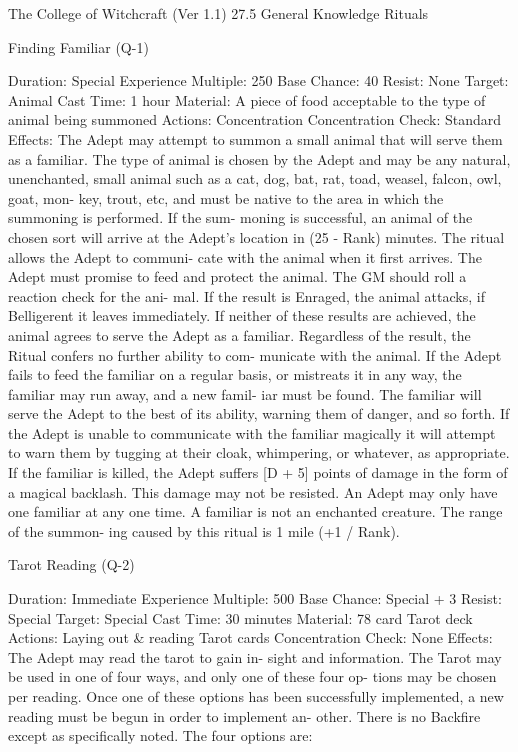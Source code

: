 \begin{Chapter}{The College of Witchcraft (Ver 1.1)}
27.5 General Knowledge Rituals 

Finding Familiar (Q-1) 

Duration: Special 
Experience Multiple: 250 
Base Chance: 40%
Resist: None 
Target: Animal 
Cast Time: 1 hour 
Material: A piece of food acceptable to the type of 
animal being summoned 
Actions: Concentration 
Concentration Check: Standard 
Effects: The Adept may attempt to summon a small 
animal that will serve them as a familiar. The type 
of  animal  is  chosen  by  the  Adept  and  may  be  any 
natural,  unenchanted,  small  animal  such  as  a  cat, 
dog, bat, rat, toad, weasel, falcon, owl, goat, mon-
key,  trout,  etc,  and  must  be  native  to  the  area  in 
which  the  summoning  is  performed.  If  the  sum-
moning is successful, an animal of the chosen sort 
will  arrive  at  the  Adept’s  location  in  (25  -  Rank) 
minutes.  The  ritual  allows  the  Adept  to  communi-
cate  with  the  animal  when  it  first  arrives.  The 
Adept must promise to feed and protect the animal. 
The  GM  should  roll  a  reaction  check  for  the  ani-
mal.  If the result is Enraged, the animal attacks, if 
Belligerent  it  leaves  immediately.  If  neither  of 
these  results  are  achieved,  the  animal  agrees  to 
serve  the  Adept  as  a  familiar.  Regardless  of  the 
result, the Ritual confers no further ability to com-
municate with the animal. If the Adept fails to feed 
the familiar on a regular basis, or mistreats it in any 
way, the familiar may run away, and a new famil-
iar  must  be  found.  The  familiar  will  serve  the 
Adept  to  the  best  of  its  ability,  warning  them  of 
danger,  and  so  forth.  If  the  Adept  is  unable  to 
communicate  with  the  familiar  magically  it  will 
attempt  to  warn  them  by  tugging  at  their  cloak, 
whimpering,  or  whatever,  as  appropriate.  If  the 
familiar is killed, the Adept suffers [D + 5] points 
of damage in the form of a magical backlash. This 
damage  may  not  be  resisted.  An  Adept  may  only 
have one familiar at any one time. A familiar is not 
an  enchanted  creature.  The  range  of  the  summon-
ing caused by this ritual is 1 mile (+1 / Rank). 

Tarot Reading (Q-2) 

Duration: Immediate 
Experience Multiple: 500 
Base Chance: Special + 3%
Resist: Special 
Target: Special 
Cast Time: 30 minutes 
Material: 78 card Tarot deck 
Actions: Laying out \& reading Tarot cards 
Concentration Check: None 
Effects:  The  Adept  may  read  the  tarot  to  gain  in-
sight  and  information.  The  Tarot  may  be  used  in 
one  of  four  ways,  and  only  one  of  these  four  op-
tions may be chosen per reading. Once one of these 
options has  been  successfully  implemented, a new 
reading  must  be  begun  in  order  to  implement  an-
other.  There  is  no  Backfire  except  as  specifically 
noted. The four options are: 


\end{Chapter}
